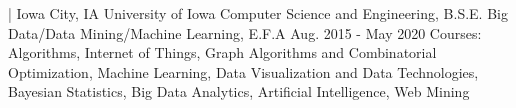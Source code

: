 

\begin{cventries}

  \cventry
    {| Iowa City, IA} %
    {University of Iowa} %
    {Computer Science and Engineering, B.S.E.\linebreak
	Big Data/Data Mining/Machine Learning, E.F.A}
    {Aug. 2015 - May 2020} %
    {Courses: Algorithms, Internet of Things, Graph Algorithms and Combinatorial Optimization, Machine Learning, Data Visualization and Data Technologies, Bayesian Statistics, Big Data Analytics, Artificial Intelligence, Web Mining}
\end{cventries}
